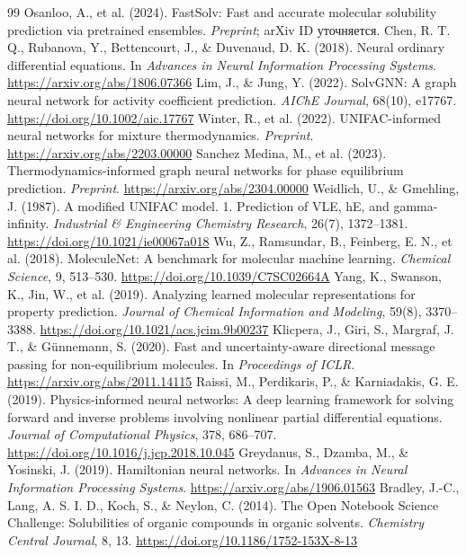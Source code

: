\documentclass[11pt]{article}
\begin{document}
\begin{thebibliography}{99}
   Osanloo, A., et al. (2024). FastSolv: Fast and accurate molecular solubility prediction via pretrained ensembles. \textit{Preprint}; arXiv ID уточняется.
   Chen, R. T. Q., Rubanova, Y., Bettencourt, J., \& Duvenaud, D. K. (2018). Neural ordinary differential equations. In \textit{Advances in Neural Information Processing Systems}. \url{https://arxiv.org/abs/1806.07366}
   Lim, J., \& Jung, Y. (2022). SolvGNN: A graph neural network for activity coefficient prediction. \textit{AIChE Journal}, 68(10), e17767. \url{https://doi.org/10.1002/aic.17767}
   Winter, R., et al. (2022). UNIFAC-informed neural networks for mixture thermodynamics. \textit{Preprint}. \url{https://arxiv.org/abs/2203.00000}
   Sanchez Medina, M., et al. (2023). Thermodynamics-informed graph neural networks for phase equilibrium prediction. \textit{Preprint}. \url{https://arxiv.org/abs/2304.00000}
   Weidlich, U., \& Gmehling, J. (1987). A modified UNIFAC model. 1. Prediction of VLE, hE, and gamma-infinity. \textit{Industrial \& Engineering Chemistry Research}, 26(7), 1372--1381. \url{https://doi.org/10.1021/ie00067a018}
   Wu, Z., Ramsundar, B., Feinberg, E. N., et al. (2018). MoleculeNet: A benchmark for molecular machine learning. \textit{Chemical Science}, 9, 513--530. \url{https://doi.org/10.1039/C7SC02664A}
   Yang, K., Swanson, K., Jin, W., et al. (2019). Analyzing learned molecular representations for property prediction. \textit{Journal of Chemical Information and Modeling}, 59(8), 3370--3388. \url{https://doi.org/10.1021/acs.jcim.9b00237}
   Klicpera, J., Giri, S., Margraf, J. T., \& Günnemann, S. (2020). Fast and uncertainty-aware directional message passing for non-equilibrium molecules. In \textit{Proceedings of ICLR}. \url{https://arxiv.org/abs/2011.14115}
   Raissi, M., Perdikaris, P., \& Karniadakis, G. E. (2019). Physics-informed neural networks: A deep learning framework for solving forward and inverse problems involving nonlinear partial differential equations. \textit{Journal of Computational Physics}, 378, 686--707. \url{https://doi.org/10.1016/j.jcp.2018.10.045}
   Greydanus, S., Dzamba, M., \& Yosinski, J. (2019). Hamiltonian neural networks. In \textit{Advances in Neural Information Processing Systems}. \url{https://arxiv.org/abs/1906.01563}
   Bradley, J.-C., Lang, A. S. I. D., Koch, S., \& Neylon, C. (2014). The Open Notebook Science Challenge: Solubilities of organic compounds in organic solvents. \textit{Chemistry Central Journal}, 8, 13. \url{https://doi.org/10.1186/1752-153X-8-13}


\end{thebibliography}
\end{document}

